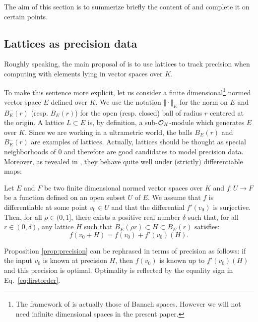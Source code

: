\documentclass{sig-alternate}
\begin{document}
The aim of this section is to summerize briefly the content of 
\cite{caruso-roe-vaccon:14a} and complete it on certain points.

\subsection{Lattices as precision data}

Roughly speaking, the main proposal of \cite{caruso-roe-vaccon:14a} is 
to use lattices to track precision when computing with elements lying in 
vector spaces over $K$.

To make this sentence more explicit, let us consider a finite 
dimensional\footnote{The framework of \cite{caruso-roe-vaccon:14a} is 
actually those of Banach spaces. However we will not need infinite 
dimensional spaces in the present paper.} normed vector space $E$ 
defined over $K$. We use the notation $\Vert \cdot \Vert_E$ for the norm 
on $E$ and $B^-_E(r)$ (resp. $B^{\phantom -}_E(r)$) for the open (resp. 
closed) ball of radius $r$ centered at the origin. A lattice $L \subset 
E$ is, by definition, a sub-$\mathcal O_K$-module which generates $E$ over $K$. 
Since we are working in a ultrametric world, the balls $B^{\phantom 
-}_E(r)$ and $B^-_E(r)$ are examples of lattices. Actually, lattices 
should be thought as special neighborhoods of $0$ and therefore are good 
candidates to model precision data. Moreover, as revealed in 
\cite{caruso-roe-vaccon:14a}, they behave quite well under (strictly) 
differentiable maps:

\begin{prop}
\label{prop:precision}
Let $E$ and $F$ be two finite dimensional normed vector spaces over $K$ 
and $f : U \rightarrow F$ be a function defined on an open subset $U$ of 
$E$. We assume that $f$ is differentiable at some point $v_0 \in U$ and 
that the differential $f'(v_0)$ is surjective.
Then, for all $\rho \in (0, 1]$, there exists a positive real
number $\delta$ such that, for all $r \in (0, \delta)$, any lattice
$H$ such that $B^-_E(\rho r) \subset H \subset B^{\phantom -}_E(r)$ 
satisfies:
\begin{equation}
\label{eq:firstorder}
f(v_0 + H) = f(v_0) + f'(v_0) (H).
\end{equation}
\end{prop}

Proposition \ref{prop:precision} can be rephrased in terms of precision 
as follows: if the input $v_0$ is known at precision $H$, then $f(v_0)$ 
is known up to $f'(v_0)(H)$ and this precision is optimal. Optimality is 
reflected by the equality sign in Eq.~\eqref{eq:firstorder}.
\end{document}
